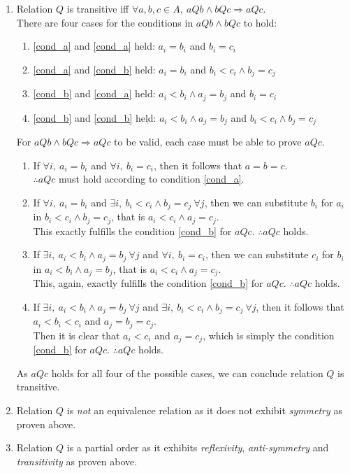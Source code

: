 \documentclass[12pt]{article}
\begin{document}
\begin{enumerate}[label = \textbf{(\roman*)}]
	\item
		Relation $Q$ is transitive iff $\forall a,b,c \in A,\ aQb \land bQc \Rightarrow aQc$.\\
		There are four cases for the conditions in $aQb \land bQc$ to hold:
		\begin{enumerate}[label = \arabic*.]
			\itemsep0em
			\item \ref{cond_a} and \ref{cond_a} held: $a_i = b_i$ and $b_i = c_i$
			\item \ref{cond_a} and \ref{cond_b} held: $a_i = b_i$ and $b_i < c_i \land b_j = c_j$
			\item \ref{cond_b} and \ref{cond_a} held: $a_i < b_i \land a_j = b_j$ and $b_i = c_i$
			\item \ref{cond_b} and \ref{cond_b} held: $a_i < b_i \land a_j = b_j$ and $b_i < c_i \land b_j = c_j$
		\end{enumerate}
		For $aQb \land bQc \Rightarrow aQc$ to be valid, each case must be able to prove $aQc$.
		\begin{enumerate}[label = \arabic*.]
			\itemsep0em
			\item
				If $\forall i,\ a_i = b_i$ and $\forall i,\ b_i = c_i$, then it follows that $a = b = c$.\\
				$\therefore aQc$ must hold according to condition \ref{cond_a}.
			\item
				If $\forall i,\ a_i = b_i$ and $\exists i,\ b_i < c_i \land b_j = c_j\ \forall j$, then we can substitute $b_i$ for $a_i$ in $b_i < c_i \land b_j = c_j$, that is $a_i < c_i \land a_j = c_j$.\\
				This exactly fulfills the condition \ref{cond_b} for $aQc$. $\therefore aQc$ holds.
			\item
				If $\exists i,\ a_i < b_i \land a_j = b_j\ \forall j$ and $\forall i,\ b_i = c_i$, then we can substitute $c_i$ for $b_i$ in $a_i < b_i \land a_j = b_j$, that is $a_i < c_i \land a_j = c_j$.\\
				This, again, exactly fulfills the condition \ref{cond_b} for $aQc$. $\therefore aQc$ holds.
			\item
				If $\exists i,\ a_i < b_i \land a_j = b_j\ \forall j$ and $\exists i,\ b_i < c_i \land b_j = c_j\ \forall j$, then it follows that $a_i < b_i < c_i$ and $a_j = b_j = c_j$.\\
				Then it is clear that $a_i < c_i$ and $a_j = c_j$, which is simply the condition \ref{cond_b} for $aQc$. $\therefore aQc$ holds.
		\end{enumerate}
		As $aQc$ holds for all four of the possible cases, we can conclude relation $Q$ is transitive.

	\item Relation $Q$ is \textit{not} an equivalence relation as it does not exhibit \textit{symmetry} as proven above.
	\item Relation $Q$ is a partial order as it exhibits \textit{reflexivity}, \textit{anti-symmetry} and \textit{transitivity} as proven above.

\end{enumerate}
\pagebreak
\end{document}
